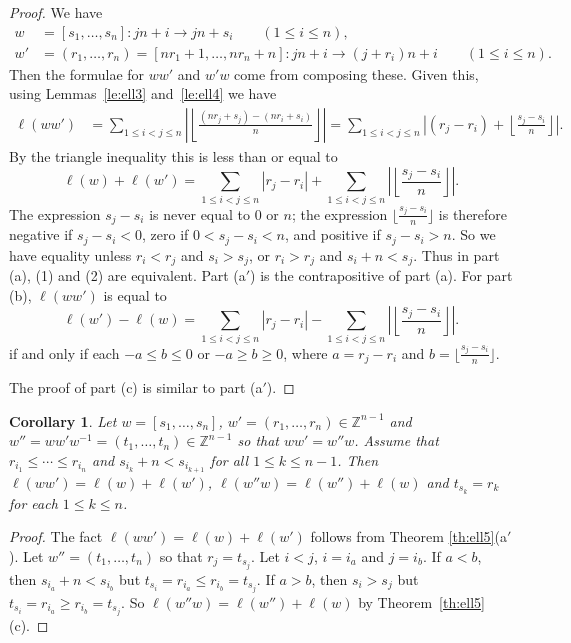 \documentclass[12pt]{amsart}
\renewcommand{\ge}{\geqslant}
\renewcommand{\le}{\leqslant}
\newcommand{\bZ}{{\mathbb{Z}}}
\numberwithin{equation}{section}
\newtheorem{corollary}[equation]{Corollary}
\theoremstyle{definition}
\begin{document}
\begin{proof}
We have
\begin{align*}
 w&=[s_1,\dots,s_n] \colon jn+i \to jn+s_i\qquad (1\le i\le n), \\
 w'&= (r_1,\dots,r_n)=[nr_1+1,\dots,nr_n+n] \colon jn+i \to
     (j+r_i)n+i\qquad (1\le i\le n).
\end{align*}
Then the formulae for $ww'$ and $w'w$ come from composing these. Given
this, using Lemmas~\ref{le:ell3} and~\ref{le:ell4} we have
\begin{align*} 
\ell(ww')&=\sum_{1\le i<j\le n}
\left|\left\lfloor\frac{(nr_j+s_j)-(nr_i+s_i)}{n}\right\rfloor\right|
=\sum_{1\le i<j\le n}\left|(r_j-r_i)+\left\lfloor\frac{s_j-s_i}{n}\right\rfloor\right|.
\end{align*}
By the triangle inequality this is less than or equal to
\[ \ell(w)+\ell(w')=\sum_{1\le i<j\le n} |r_j-r_i|+\sum_{1\le i<j\le n}
\left|\left\lfloor\frac{s_j-s_i}{n}\right\rfloor\right|.
\]
The expression $s_j-s_i$ is never equal to $0$ or $n$; the expression
$\lfloor\frac{s_j-s_i}{n}\rfloor$ is therefore negative if
$s_j-s_i<0$, 
zero if $0<s_j-s_i<n$, and positive if $s_j-s_i>n$.
So we have equality
unless $r_i<r_j$ and $s_i>s_j$, or $r_i>r_j$ and $s_i+n<s_j$.
Thus in part (a), (1) and (2) are equivalent. Part (a$'$) is the
contrapositive of part (a).
For part (b), $\ell(ww')$ is equal to
\[ \ell(w')-\ell(w)=\sum_{1\le i<j\le n} |r_j-r_i|-\sum_{1\le i<j\le n}
\left|\left\lfloor\frac{s_j-s_i}{n}\right\rfloor\right|.
\]
if and only if each $-a\le b\le 0$ or $-a\ge b\ge 0$, where $a=r_j-r_i$
and $b=\lfloor \frac{s_j-s_i}{n}\rfloor$.

The proof of part (c) is similar to part (a$'$).
\end{proof}

\begin{corollary}\label{co:ellww'=w''w} 
Let $w=[s_1,\ldots,s_n]$, $w'=(r_1,\ldots,r_n)\in\bZ^{n-1}$ and
$w''=ww'w^{-1}=(t_1,\ldots,t_n)\in\bZ^{n-1}$ so that
$ww'=w''w$. Assume that $r_{i_1}\le\cdots\le r_{i_n}$ and
$s_{i_k}+n<s_{i_{k+1}}$ for all $1\le k\le n-1$. Then
$\ell(ww')=\ell(w)+\ell(w')$, $\ell(w''w)=\ell(w'')+\ell(w)$ and
$t_{s_k}=r_k$ for each $1\le k\le n$. 
\end{corollary}
\begin{proof} The fact $\ell(ww')=\ell(w)+\ell(w')$ follows from
  Theorem \ref{th:ell5}(a$'$). Let $w''=(t_1,\ldots,t_n)$ so that
  $r_j=t_{s_j}$. Let $i<j$, $i=i_a$ and $j=i_b$. If $a<b$, then
  $s_{i_a}+n<s_{i_b}$ but $t_{s_i}=r_{i_a}\le r_{i_b}= t_{s_j}$. If
  $a>b$, then $s_i>s_j$ but $t_{s_i}=r_{i_a}\ge r_{i_b}=t_{s_j}$. So
  $\ell(w''w)=\ell(w'')+\ell(w)$ by Theorem~\ref{th:ell5}(c). 
\end{proof}
\end{document}
